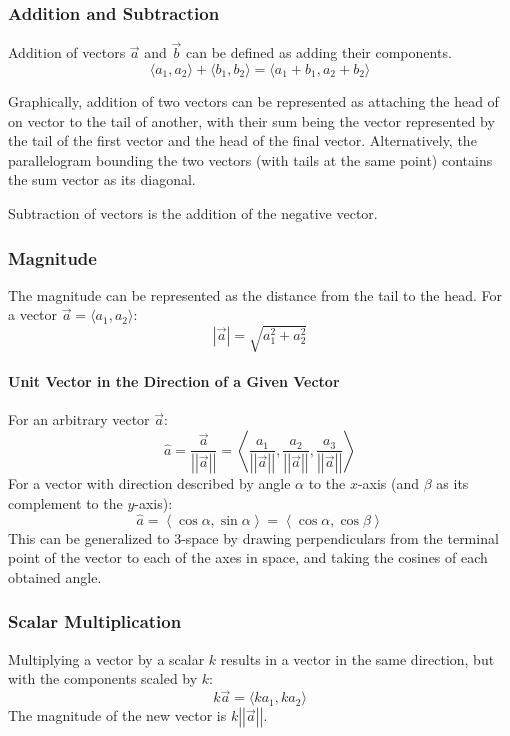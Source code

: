 \documentclass{article}
\begin{document}
\subsubsection{Addition and Subtraction}
Addition of vectors $\overrightarrow{a}$ and $\overrightarrow{b}$ can be defined as adding their components.
$$\langle a_1, a_2 \rangle + \langle b_1, b_2 \rangle = \langle a_1 + b_1, a_2 + b_2\rangle$$

Graphically, addition of two vectors can be represented as attaching the head of on vector to the tail of another, with their sum being the vector represented by the tail of the first vector and the head of the final vector. Alternatively, the parallelogram bounding the two vectors (with tails at the same point) contains the sum vector as its diagonal.

Subtraction of vectors is the addition of the negative vector.

\subsubsection{Magnitude}
The magnitude can be represented as the distance from the tail to the head. For a vector $\overrightarrow{a} = \langle a_1, a_2 \rangle$:
$$\left|\overrightarrow{a}\right| = \sqrt{a_1^2+a_2^2}$$

\paragraph{Unit Vector in the Direction of a Given Vector}
For an arbitrary vector $\overrightarrow{a}$:
$$\hat{a} = \frac{\overrightarrow{a}}{\left|\left|\overrightarrow{a}\right|\right|} = \left\langle \frac{a_1}{\left|\left|\overrightarrow{a}\right|\right|}, \frac{a_2}{\left|\left|\overrightarrow{a}\right|\right|}, \frac{a_3}{\left|\left|\overrightarrow{a}\right|\right|} \right\rangle$$
For a vector with direction described by angle $\alpha$ to the $x$-axis (and $\beta$ as its complement to the $y$-axis):
$$\hat{a} = \left\langle \cos{\alpha}, \sin{\alpha} \right\rangle = \left\langle \cos{\alpha}, \cos{\beta} \right\rangle$$
This can be generalized to 3-space by drawing perpendiculars from the terminal point of the vector to each of the axes in space, and taking the cosines of each obtained angle.

\subsubsection{Scalar Multiplication}
Multiplying a vector by a scalar $k$ results in a vector in the same direction, but with the components scaled by $k$:
$$k\overrightarrow{a} = \langle ka_1, ka_2 \rangle$$
The magnitude of the new vector is $k\left|\left|\overrightarrow{a}\right|\right|$.
\end{document}
